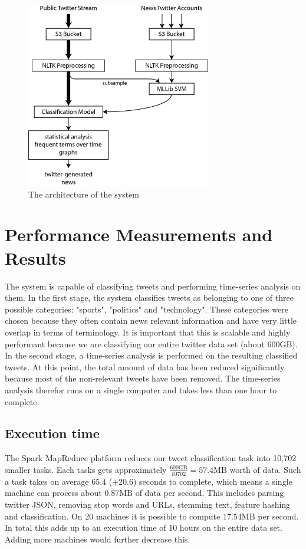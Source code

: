 \documentclass{llncs}
\begin{document}
\begin{figure}
	\centering
	\includegraphics[width=0.72\textwidth]{images/system_arch.png} 
	\caption{The architecture of the system}
	\label{fig:architecture}
\end{figure}

\section{Performance Measurements and Results}
The system is capable of classifying tweets and performing time-series analysis on them. In the first stage, the system classifies tweets as belonging to one of three possible categories: "sports", "politics" and "technology". These categories were chosen because they often contain news relevant information and have very little overlap in terms of terminology. It is important that this is scalable and highly performant because we are classifying our entire twitter data set (about $600\text{GB}$). In the second stage, a time-series analysis is performed on the resulting classified tweets. At this point, the total amount of data has been reduced significantly because most of the non-relevant tweets have been removed. The time-series analysis therefor runs on a single computer and takes less than one hour to complete.

\subsection{Execution time}
The Spark MapReduce platform reduces our tweet classification task into 10,702 smaller tasks. Each tasks gets approximately $\frac{600\text{GB}}{10702} = 57.4\text{MB}$ worth of data. Such a task takes on average $65.4$ ($\pm 20.6$) seconds to complete, which means a single machine can process about $0.87\text{MB}$ of data per second. This includes parsing twitter JSON, removing stop words and URLs, stemming text, feature hashing and classification. On 20 machines it is possible to compute $17.54\text{MB}$ per second. In total this adds up to an execution time of 10 hours on the entire data set. Adding more machines would further decrease this.
\end{document}
